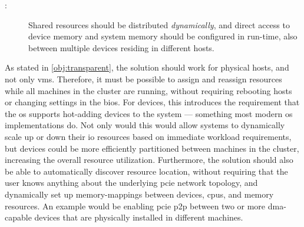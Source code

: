 \begin{description}    
    \item[:] Shared resources should be distributed \emph{dynamically}, and direct access to device memory and system memory should be configured in run-time, also between multiple devices residing in different hosts.
\end{description}
As stated in \cref{obj:transparent}, the solution should work for physical hosts, and not only \glspl{vm}. Therefore, it must be possible to assign and reassign resources while all machines in the cluster are running, without requiring rebooting hosts or changing settings in the \gls{bios}.
For devices, this introduces the requirement that the \gls{os} supports hot-adding devices to the system --- something most modern \gls{os} implementations do.
Not only would this would allow systems to dynamically scale up or down their \gls{io} resources based on immediate workload requirements, but devices could be more efficiently partitioned between machines in the cluster, increasing the overall resource utilization. 
Furthermore, the solution should also be able to automatically discover resource location, without requiring that the user knows anything about the underlying \gls{pcie} network topology, and dynamically set up memory-mappings between devices, \glspl{cpu}, and memory resources. An example would be enabling \gls{pcie} \gls{p2p} between two or more \gls{dma}-capable devices that are physically installed in different machines.

